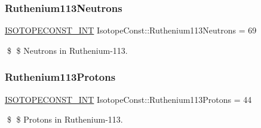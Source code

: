 \subsubsection{\texorpdfstring{Ruthenium113\+Neutrons}{Ruthenium113Neutrons}}
{\footnotesize\ttfamily \mbox{\hyperlink{group___isotope_const-_macros_ga5f18360b3e99483a35c32d789e62621c}{I\+S\+O\+T\+O\+P\+E\+C\+O\+N\+S\+T\+\_\+\+I\+NT}} Isotope\+Const\+::\+Ruthenium113\+Neutrons = 69}

\$ \$ Neutrons in Ruthenium-\/113. \mbox{\label{group___isotope_const-_ruthenium-_ru113_ga527f31dfdd26c2b9fd127fbf4ed5d997}} 
\subsubsection{\texorpdfstring{Ruthenium113\+Protons}{Ruthenium113Protons}}
{\footnotesize\ttfamily \mbox{\hyperlink{group___isotope_const-_macros_ga5f18360b3e99483a35c32d789e62621c}{I\+S\+O\+T\+O\+P\+E\+C\+O\+N\+S\+T\+\_\+\+I\+NT}} Isotope\+Const\+::\+Ruthenium113\+Protons = 44}

\$ \$ Protons in Ruthenium-\/113. 